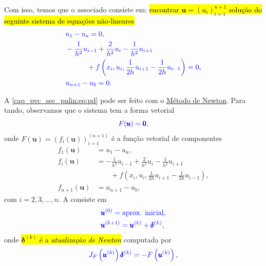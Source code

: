 Com isso, temos que o  associado consiste em: \hl{encontrar $\pmb{u} = (u_i)_{i=1}^{n+1}$ solução do seguinte sistema de equações não-lineares}
\begin{subequations}\label{cap_pvc_sec_pnlin:eq:pd}\hleq
  \begin{align}
    &u_1 - u_a = 0,\\
    &-\frac{1}{h^2}u_{i-1} + \frac{2}{h^2}u_i - \frac{1}{h^2}u_{i+1}\nonumber\\
    &\quad\quad\quad + f\left(x_i, u_i, \frac{1}{2h}u_{i+1}-\frac{1}{2h}u_{i-1}\right) = 0,\\
    &u_{n+1} - u_b = 0.
  \end{align}
\end{subequations}

A  \eqref{cap_pvc_sec_pnlin:eq:pd} pode ser feito com o \href{https://notaspedrok.com.br/notas/MatematicaNumericaI/cap_snl_sec_newton.html}{Método de Newton}{\newton}. Para tando, observamos que o sistema tem a forma vetorial
\begin{equation}\color{blue}F(\pmb{u}) = \pmb{0},
\end{equation}
onde $F(\pmb{u}) = \left(f_i(\pmb{u})\right)_{i=1}^{(n+1)}$ é a função vetorial de componentes
\begin{subequations}
  \begin{align}
    f_1(\pmb{u}) &= u_1 - u_a,\\
    f_i(\pmb{u}) &= -\frac{1}{h^2}u_{i-1} + \frac{2}{h^2}u_i - \frac{1}{h^2}u_{i+1}\nonumber\\
                 &\quad\quad + f\left(x_i, u_i, \frac{1}{2h}u_{i+1}-\frac{1}{2h}u_{i-1}\right),\\
    f_{n+1}(\pmb{u}) &= u_{n+1} - u_b,
  \end{align}
\end{subequations}
com $i = 2, 3, \dotsc, n$. A  consiste em
\begin{subequations}\hleq
  \begin{align}
    &\pmb{u}^{(0)} = \text{aprox. inicial},\\
    &\pmb{u}^{(k+1)} = \pmb{u}^{(k)} + \pmb{\delta}^{(k)},
  \end{align}
\end{subequations}
onde \hl{$\pmb{\delta}^{(k)}$ é a \emph{atualização de Newton}} computada por
\begin{equation}\color{blue}J_{F}\left(\pmb{u}^{(k)}\right)\pmb{\delta}^{(k)} = -F\left(\pmb{u}^{(k)}\right),
\end{equation}

